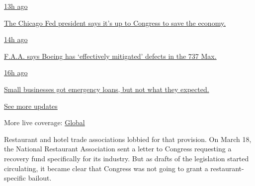 \href{https://www.nytimes.com/live/2020/08/03/business/stock-market-today-coronavirus?action=click\&pgtype=Article\&state=default\&region=MAIN_CONTENT_1\&context=storylines_live_updates\#the-chicago-fed-president-says-its-up-to-congress-to-save-the-economy}{13h
ago}

\href{https://www.nytimes.com/live/2020/08/03/business/stock-market-today-coronavirus?action=click\&pgtype=Article\&state=default\&region=MAIN_CONTENT_1\&context=storylines_live_updates\#the-chicago-fed-president-says-its-up-to-congress-to-save-the-economy}{The
Chicago Fed president says it's up to Congress to save the economy.}

\href{https://www.nytimes.com/live/2020/08/03/business/stock-market-today-coronavirus?action=click\&pgtype=Article\&state=default\&region=MAIN_CONTENT_1\&context=storylines_live_updates\#faa-says-boeing-has-effectively-mitigated-defects-in-the-737-max}{14h
ago}

\href{https://www.nytimes.com/live/2020/08/03/business/stock-market-today-coronavirus?action=click\&pgtype=Article\&state=default\&region=MAIN_CONTENT_1\&context=storylines_live_updates\#faa-says-boeing-has-effectively-mitigated-defects-in-the-737-max}{F.A.A.
says Boeing has `effectively mitigated' defects in the 737 Max.}

\href{https://www.nytimes.com/live/2020/08/03/business/stock-market-today-coronavirus?action=click\&pgtype=Article\&state=default\&region=MAIN_CONTENT_1\&context=storylines_live_updates\#small-businesses-got-emergency-loans-but-not-what-they-expected}{16h
ago}

\href{https://www.nytimes.com/live/2020/08/03/business/stock-market-today-coronavirus?action=click\&pgtype=Article\&state=default\&region=MAIN_CONTENT_1\&context=storylines_live_updates\#small-businesses-got-emergency-loans-but-not-what-they-expected}{Small
businesses got emergency loans, but not what they expected.}

\href{https://www.nytimes.com/live/2020/08/03/business/stock-market-today-coronavirus?action=click\&pgtype=Article\&state=default\&region=MAIN_CONTENT_1\&context=storylines_live_updates}{See
more updates}

More live coverage:
\href{https://www.nytimes.com/2020/08/04/world/coronavirus-covid-19.html?action=click\&pgtype=Article\&state=default\&region=MAIN_CONTENT_1\&context=storylines_live_updates}{Global}

Restaurant and hotel trade associations lobbied for that provision. On
March 18, the National Restaurant Association sent a letter to Congress
requesting a recovery fund specifically for its industry. But as drafts
of the legislation started circulating, it became clear that Congress
was not going to grant a restaurant-specific bailout.

